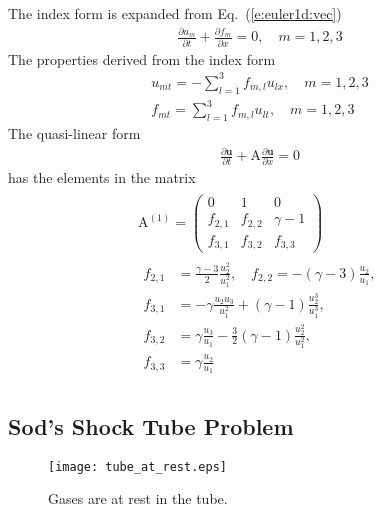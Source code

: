 \documentclass{turgon}
\begin{document}
The index form is expanded from Eq.~(\ref{e:euler1d:vec})
%
\begin{align}
  \frac{\partial u_m}{\partial t} + \frac{\partial f_m}{\partial x}
  = 0, \quad m = 1, 2, 3
  \label{e:euler1:idx}
\end{align}
%
The properties derived from the index form
%
\begin{gather}
  u_{mt} = -\sum_{l=1}^3 f_{m,l} u_{lx},  \quad m = 1, 2, 3
  \label{e:euler1:ut}
  \\
  f_{mt} = \sum_{l=1}^3 f_{m,l} u_{lt},  \quad m = 1, 2, 3
  \label{e:euler1:ft}
\end{gather}
%
The quasi-linear form
%
\begin{align}
  \frac{\partial\mathbf{u}}{\partial t}
  + \mathrm{A} \frac{\partial\mathbf{u}}{\partial x} = 0
  \label{e:euler1d:qlinear}
\end{align}
%
has the elements in the matrix
%
\begin{gather}
  \begin{gathered}
    \mathrm{A}^{(1)} = \left(
    \begin{array}{ccc}
      0             & 1             & 0 \\
      f_{2,1} & f_{2,2} & \gamma - 1 \\
      f_{3,1} & f_{3,2} & f_{3,3}
    \end{array}
    \right)
    \\
    \begin{aligned}
      f_{2,1} &= \frac{\gamma-3}{2}\frac{u_2^2}{u_1^2}, \quad
      f_{2,2} = -(\gamma-3)\frac{u_2}{u_1}, \\
      f_{3,1} &= -\gamma\frac{u_2 u_3}{u_1^2}
      + (\gamma-1)\frac{u_2^3}{u_1^3}, \\
      f_{3,2} &= \gamma\frac{u_3}{u_1}
      - \frac{3}{2}(\gamma-1)\frac{u_2^2}{u_1^2}, \\
      f_{3,3} &= \gamma\frac{u_2}{u_1}
    \end{aligned}
  \end{gathered}
  \label{e:euler1d:jaco}
\end{gather}

\subsection{Sod's Shock Tube Problem}

\begin{figure}[h]
\centering
\texttt{[image: tube\_at\_rest.eps]}
\caption{Gases are at rest in the tube.}
\label{f:tube_at_rest}
\end{figure}
\end{document}
